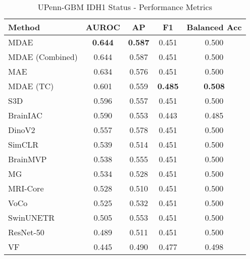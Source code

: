 \begin{table}[ht]
\centering
\caption{UPenn-GBM IDH1 Status - Performance Metrics}
\label{tab:upenn_gbm_idh1_status}
\begin{tabular}{lcccc}
\toprule
Method & AUROC & AP & F1 & Balanced Acc \\
\midrule
MDAE & \textbf{0.644} & \textbf{0.587} & 0.451 & 0.500 \\
MDAE (Combined) & 0.644 & 0.587 & 0.451 & 0.500 \\
MAE & 0.634 & 0.576 & 0.451 & 0.500 \\
MDAE (TC) & 0.601 & 0.559 & \textbf{0.485} & \textbf{0.508} \\
S3D & 0.596 & 0.557 & 0.451 & 0.500 \\
BrainIAC & 0.590 & 0.553 & 0.443 & 0.485 \\
DinoV2 & 0.557 & 0.578 & 0.451 & 0.500 \\
SimCLR & 0.539 & 0.514 & 0.451 & 0.500 \\
BrainMVP & 0.538 & 0.555 & 0.451 & 0.500 \\
MG & 0.534 & 0.528 & 0.451 & 0.500 \\
MRI-Core & 0.528 & 0.510 & 0.451 & 0.500 \\
VoCo & 0.525 & 0.532 & 0.451 & 0.500 \\
SwinUNETR & 0.505 & 0.553 & 0.451 & 0.500 \\
ResNet-50 & 0.489 & 0.511 & 0.451 & 0.500 \\
VF & 0.445 & 0.490 & 0.477 & 0.498 \\
\bottomrule
\end{tabular}
\end{table}
